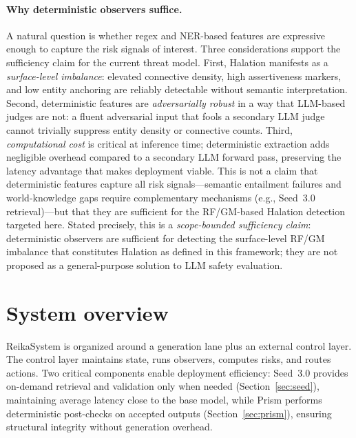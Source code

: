 \documentclass[11pt,a4paper]{article}
\begin{document}
\paragraph{Why deterministic observers suffice.}
A natural question is whether regex and NER-based features are expressive enough
to capture the risk signals of interest.
Three considerations support the sufficiency claim for the current threat model.
First, Halation manifests as a \textit{surface-level imbalance}: elevated connective
density, high assertiveness markers, and low entity anchoring are reliably detectable
without semantic interpretation.
Second, deterministic features are \textit{adversarially robust} in a way that
LLM-based judges are not: a fluent adversarial input that fools a secondary LLM
judge cannot trivially suppress entity density or connective counts.
Third, \textit{computational cost} is critical at inference time; deterministic
extraction adds negligible overhead compared to a secondary LLM forward pass,
preserving the latency advantage that makes deployment viable.
This is not a claim that deterministic features capture all risk signals---semantic
entailment failures and world-knowledge gaps require complementary mechanisms
(e.g., Seed~3.0 retrieval)---but that they are sufficient for the RF/GM-based
Halation detection targeted here.
Stated precisely, this is a \textit{scope-bounded sufficiency claim}: deterministic
observers are sufficient for detecting the surface-level RF/GM imbalance that
constitutes Halation as defined in this framework; they are not proposed as a
general-purpose solution to LLM safety evaluation.

\section{System overview}

ReikaSystem is organized around a generation lane plus an external control layer.
The control layer maintains state, runs observers, computes risks, and routes actions.
Two critical components enable deployment efficiency: Seed~3.0 provides on-demand
retrieval and validation only when needed (Section~\ref{sec:seed}), maintaining average
latency close to the base model, while Prism performs deterministic post-checks on
accepted outputs (Section~\ref{sec:prism}), ensuring structural integrity without
generation overhead.
\end{document}
